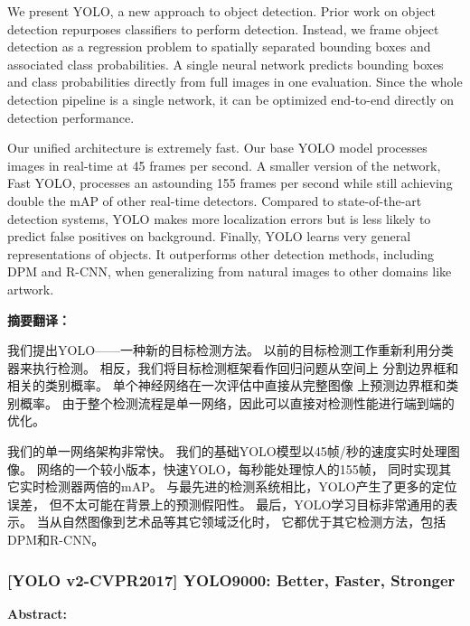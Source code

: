 \documentclass[a4paper, notitlepage]{article}
\begin{document}
We present YOLO, a new approach to object detection.
Prior work on object detection repurposes classifiers to perform
detection. Instead, we frame object detection as a regression
problem to spatially separated bounding boxes and
associated class probabilities. A single neural network predicts
bounding boxes and class probabilities directly from
full images in one evaluation. Since the whole detection
pipeline is a single network, it can be optimized end-to-end
directly on detection performance.

Our unified architecture is extremely fast. Our base
YOLO model processes images in real-time at 45 frames
per second. A smaller version of the network, Fast YOLO,
processes an astounding 155 frames per second while
still achieving double the mAP of other real-time detectors.
Compared to state-of-the-art detection systems, YOLO
makes more localization errors but is less likely to predict
false positives on background. Finally, YOLO learns very
general representations of objects. It outperforms other detection
methods, including DPM and R-CNN, when generalizing
from natural images to other domains like artwork.

\textbf{摘要翻译：}

我们提出YOLO——一种新的目标检测方法。
以前的目标检测工作重新利用分类器来执行检测。
相反，我们将目标检测框架看作回归问题从空间上
分割边界框和相关的类别概率。
单个神经网络在一次评估中直接从完整图像
上预测边界框和类别概率。
由于整个检测流程是单一网络，因此可以直接对检测性能进行端到端的优化。

我们的单一网络架构非常快。
我们的基础YOLO模型以45帧/秒的速度实时处理图像。
网络的一个较小版本，快速YOLO，每秒能处理惊人的155帧，
同时实现其它实时检测器两倍的mAP。
与最先进的检测系统相比，YOLO产生了更多的定位误差，
但不太可能在背景上的预测假阳性。
最后，YOLO学习目标非常通用的表示。
当从自然图像到艺术品等其它领域泛化时，
它都优于其它检测方法，包括DPM和R-CNN。

\subsubsection{[YOLO v2-CVPR2017] YOLO9000: Better, Faster, Stronger}
\textbf{Abstract:}
\end{document}
